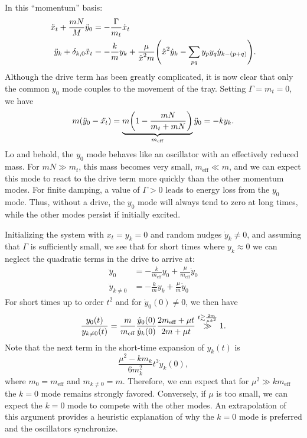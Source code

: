 \documentclass[10pt,aps,pra,twocolumn,nofootinbib,superscriptaddress,floatfix]{revtex4-2}
\let\orghat\hat
\def\hat#1{\orghat{\kern0pt #1}}
\begin{document}
In this ``momentum'' basis:
\begin{align}
  \label{eq:eom_tray_fourier}
  \ddot{x}_{t} + \frac{m N}{M} \ddot{y}_{0}&=  {- \frac{\Gamma}{m_{t}} \dot{x}_{t}}\\
  \label{eq:eom_fourier_modes}\ddot{y}_{k}+\delta_{k,0}\ddot{x}_{t} &= -\frac{k}{m} y_{k} +{\frac{\mu}{\hat{x}^{2}m} \pqty{\hat{x}^{2}\dot{y}_{k}-\sum_{pq}y_{p}y_{q}\dot{y}_{k-(p+q)}}}.
\end{align}
Although the drive term has been greatly complicated, it is now clear that only the common \(y_{0}\) mode couples to the movement of the tray. Setting \(\Gamma=m_{t}=0\), we have
\begin{equation}
  \label{eq:effective_mass}
  m {\pqty{\ddot{y}_{0}-\ddot{x_{t}}}} = \underbrace{m \pqty{1 - \frac{mN}{m_{t} + mN}}}_{m_{\text{eff}}}\ddot{y}_{0}=-k y_{k}.
\end{equation}
Lo and behold, the \(y_{0}\) mode behaves like an oscillator with an effectively reduced mass. For \(m N \gg m_{t}\), this mass becomes very small, \(m_{\text{eff}} \ll m\), and we can expect this mode to react to the drive term more quickly than the other momentum modes. For finite damping, a value of \(\Gamma >0\) leads to energy loss from the \(y_{0}\) mode. Thus, without a drive, the \(y_{0}\) mode will always tend to zero at long times, while the other modes persist if initially excited.

Initializing the system with \(x_{t}=y_{k}=0\) and random nudges \(\dot{y}_{k}\neq 0\), and assuming that \(\Gamma\) is sufficiently small, we see that for short times where \(y_{k}\approx 0\) we can neglect the quadratic terms in the drive to arrive at:
\begin{align}
  \label{eq:linearized_eom}
  \ddot{y}_{0} &= -\frac{k}{m_{\text{eff}}}y_{0} + \frac{\mu}{m_{\text{eff}}}\dot{y}_{0}\\
  \ddot{y}_{k\neq 0} &= -\frac{k}{m} y_{k} + \frac{\mu}{m} \dot{y}_{0}
\end{align}
For short times up to order \(t^{2}\) and for \(\dot{y}_{0}(0)\neq 0\), we then have
\begin{equation}
  \label{eq:mode_ratio}
  \frac{{y_{0}(t)}}{y_{k\neq 0}(t)} =
  \frac{m}{m_{\text{eff}}}\frac{{\dot{y}_{0}(0)}}{{\dot{y}_{k}(0)}} \frac{2m_{\text{eff}} +\mu t }{2m +\mu t } \overset{t\gtrsim \frac{2m}{\mu \hat{x}^{2}}}{\gg} 1.
\end{equation}
Note that the next term in the short-time expansion of \(y_{k}(t)\) is
\begin{equation}
  \label{eq:next_order_expansion}
  \frac{\mu^{2}-km_{k}}{6m^{2}_{k}}t^{3} \dot{y}_{k}(0),
\end{equation}
where \(m_{0}=m_{\text{eff}}\) and \(m_{k\neq 0}=m\). Therefore, we can expect that for \(\mu^{2} \gg k m_{\text{eff}}\) the \(k=0\) mode remains strongly favored. Conversely, if \(\mu\) is too small, we can expect the \(k=0\) mode to compete with the other modes.
An extrapolation of this argument provides a heuristic explanation of why the \(k=0\) mode is preferred and the oscillators synchronize.
\end{document}
